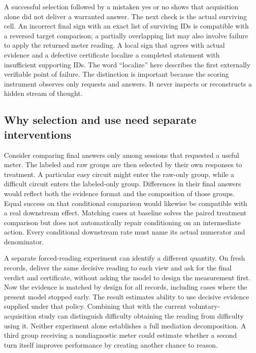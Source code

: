 \documentclass[12pt,letterpaper]{article}
\begin{document}
A successful selection followed by a mistaken yes or no shows that acquisition alone did not deliver a warranted answer. The next check is the actual surviving cell. An incorrect final sign with an exact list of surviving IDs is compatible with a reversed target comparison; a partially overlapping list may also involve failure to apply the returned meter reading. A local sign that agrees with actual evidence and a defective certificate localize a completed statement with insufficient supporting IDs. The word ``localize'' here describes the first externally verifiable point of failure. The distinction is important because the scoring instrument observes only requests and answers. It never inspects or reconstructs a hidden stream of thought.

\subsection{Why selection and use need separate interventions}

Consider comparing final answers only among sessions that requested a useful meter. The labeled and raw groups are then selected by their own responses to treatment. A particular easy circuit might enter the raw-only group, while a difficult circuit enters the labeled-only group. Differences in their final answers would reflect both the evidence format and the composition of those groups. Equal success on that conditional comparison would likewise be compatible with a real downstream effect. Matching cases at baseline solves the paired treatment comparison but does not automatically repair conditioning on an intermediate action. Every conditional downstream rate must name its actual numerator and denominator.

A separate forced-reading experiment can identify a different quantity. On fresh records, deliver the same decisive reading to each view and ask for the final verdict and certificate, without asking the model to design the measurement first. Now the evidence is matched by design for all records, including cases where the present model stopped early. The result estimates ability to use decisive evidence supplied under that policy. Combining that with the current voluntary-acquisition study can distinguish difficulty obtaining the reading from difficulty using it. Neither experiment alone establishes a full mediation decomposition. A third group receiving a nondiagnostic meter could estimate whether a second turn itself improves performance by creating another chance to reason.
\end{document}

